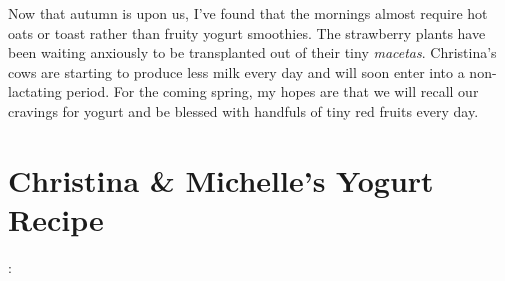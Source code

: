 \documentclass[10pt,a6paper,footinclude=false,firstfoot=false,headinclude=true,open=any,DIV=6]{scrbook} %
\begin{document}
Now that autumn is upon us, I've found that the mornings almost require hot oats or toast rather than fruity yogurt smoothies. The strawberry plants have been waiting anxiously to be transplanted out of their tiny \textit{macetas}. Christina's cows are starting to produce less milk every day and will soon enter into a non-lactating period. For the coming spring, my hopes are that we will recall our cravings for yogurt and be blessed with handfuls of tiny red fruits every \mbox{day.}

\section*{Christina \& Michelle's Yogurt Recipe}

\hspace{1em}:
\vspace{2ex}
\end{document}

